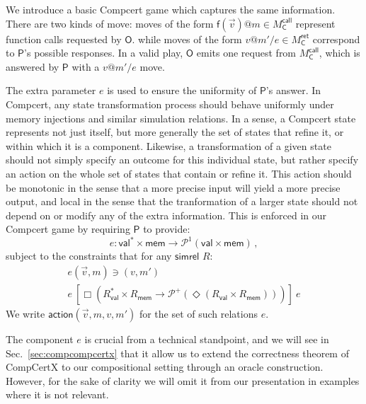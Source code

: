 \documentclass[sigplan,10pt,review,anonymous]{acmart}
\makeatletter
\newcommand{\kw}[1]{\ensuremath{ \textsf{#1} }}
\newcommand{\ifr}[1]{\ [{#1}]\ }
\newcommand{\EC}{\kw{C}}
\newcommand{\simrel}{\kw{simrel}}
\newcommand{\mcall}[3]{\kw{#1}({#2})@{#3}}
\newcommand{\mretx}[3]{{#1}@{#2}/{#3}}
\makeatother
\begin{document}
We introduce a basic Compcert game which
captures the same information.
There are two kinds of move:
moves of the form
$\mcall{f}{\vec{v}}{m} \in M_\EC^\kw{call}$
represent function calls requested by \kw{O}.
while moves of the form
$\mretx{v}{m'}{e} \in M_\EC^\kw{ret}$
correspond to \kw{P}'s possible responses.
In a valid play,
\kw{O} emits one request from $M_\EC^\kw{call}$,
which is answered by \kw{P} with a $\mretx{v}{m'}{e}$ move.

The extra parameter $e$
is used to ensure the uniformity of \kw{P}'s answer.
In Compcert,
any state transformation process should behave uniformly
under memory injections and similar simulation relations.
In a sense,
a Compcert state represents not just itself,
but more generally the set of states that refine it,
or within which it is a component.
Likewise,
a transformation of a given state
should not simply specify an outcome for this individual state,
but rather specify an action on the whole set of states that contain or refine it.
This action should be monotonic
in the sense that a more precise input will yield a more precise output,
and local in the sense that the tranformation of a larger state
should not depend on or modify any of the extra information.
This is enforced in our Compcert game by requiring \kw{P}
to provide:
\[ e : \kw{val}^* \times \kw{mem} \rightarrow \mathcal{P}^1(\kw{val} \times \kw{mem}) \,, \]
subject to the constraints that for any \simrel{} $R$:
\begin{gather*}
  e(\vec{v}, m) \ni (v, m') \\
  e \ifr{\Box (R_\kw{val}^* \times R_\kw{mem} \rightarrow
         \mathcal{P}^+(\Diamond (R_\kw{val} \times R_\kw{mem})))} e
\end{gather*}
We write $\kw{action}(\vec{v}, m, v, m')$
for the set of such relations $e$.

The component $e$ is crucial from a technical standpoint,
and we will see in Sec.~\ref{sec:compcompcertx}
that it allow us to extend the correctness theorem of CompCertX
to our compositional setting
through an oracle construction.
However, for the sake of clarity
we will omit it from our presentation
in examples where it is not relevant.
\end{document}
